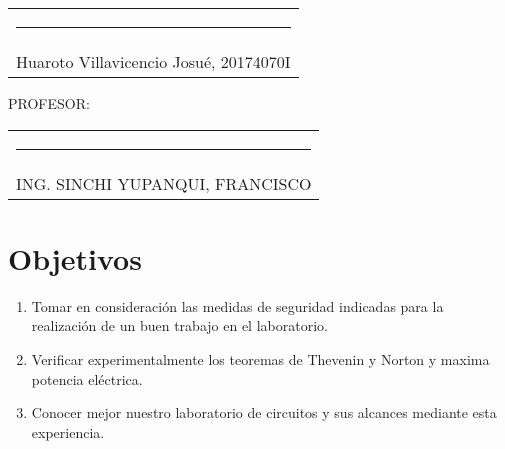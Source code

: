 \documentclass[a4paper,12pt]{report}
\begin{document}
\begin{center}
\begin{tabular}{c}
\rule[1pt]{3.14in}{1pt}\\
Huaroto Villavicencio Josué, 20174070I \\[2.5cm]
\end{tabular}
\end{center}

{\large PROFESOR:} \\[2cm]
\begin{center}
\begin{tabular}{c}
\rule[3pt]{4.8in}{1pt}\\[1pt]
ING. SINCHI YUPANQUI, FRANCISCO 
\end{tabular}
\end{center}
\vfill
\newpage
\tableofcontents
\newpage
{} %
\setcounter{page}{1}  %
\chapter{Objetivos}
\begin{enumerate}
\item Tomar en consideración las medidas de seguridad indicadas para la realización de un buen trabajo en el laboratorio.
\item Verificar experimentalmente los teoremas de Thevenin y Norton y  maxima potencia eléctrica.
\item Conocer mejor nuestro laboratorio de circuitos y sus alcances mediante esta experiencia.
\end{enumerate}
\end{document}
